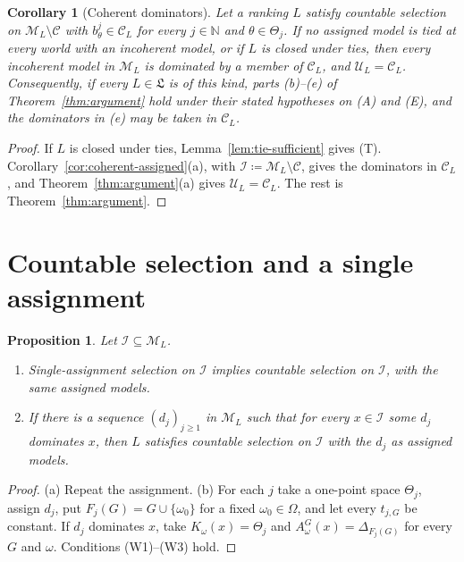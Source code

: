 \documentclass[11pt]{article}
\newtheorem{proposition}[theorem]{Proposition}
\newtheorem{corollary}[theorem]{Corollary}
\theoremstyle{definition}
\theoremstyle{remark}
\newcommand{\M}{\mathcal M}
\newcommand{\C}{\mathcal C}
\newcommand{\I}{\mathcal I}
\newcommand{\U}{\mathcal U}
\newcommand{\Lf}{\mathfrak L}
\begin{document}
\begin{corollary}[Coherent dominators]\label{cor:coherent-dominators}
Let a ranking $L$ satisfy countable selection on $\M_L\setminus\C$ with $b^j_\theta\in\C_L$ for every $j\in\mathbb N$ and $\theta\in\Theta_j$. If {\color{red}no assigned model is tied at every world with an incoherent model}, or if $L$ is closed under ties, then every incoherent model in $\M_L$ is dominated by a member of $\C_L$, and $\U_L=\C_L$. Consequently, if every $L\in\Lf$ is of this kind, parts (b)--(e) of Theorem~\ref{thm:argument} hold under their stated hypotheses on (A) and (E), and the dominators in (e) may be taken in $\C_L$.
\end{corollary}
\begin{proof}
If $L$ is closed under ties, Lemma~\ref{lem:tie-sufficient} gives {\color{red}(T)}. Corollary~\ref{cor:coherent-assigned}(a), with $\I\coloneqq\M_L\setminus\C$, gives the dominators in $\C_L$, and Theorem~\ref{thm:argument}(a) gives $\U_L=\C_L$. The rest is Theorem~\ref{thm:argument}.
\end{proof}

\section{Countable selection and a single assignment}\label{sec:scope}

\begin{proposition}\label{prop:comparison}
Let $\I\subseteq\M_L$.
\begin{enumerate}[label=(\alph*)]
\item Single-assignment selection on $\I$ implies countable selection on $\I${\color{red}, with the same assigned models}.
\item If there is a sequence $(d_j)_{j\ge1}$ in $\M_L$ such that for every $x\in\I$ some $d_j$ dominates $x$, {\color{red}then $L$ satisfies countable selection on $\I$ with the $d_j$ as assigned models.}
\end{enumerate}
\end{proposition}
\begin{proof}
(a) Repeat the assignment. (b) For each $j$ take a one-point space $\Theta_j$, assign $d_j$, put $F_j(G)=G\cup\{\omega_0\}$ for a fixed $\omega_0\in\Omega$, and let every $t_{j,G}$ be constant. If $d_j$ dominates $x$, take $K_\omega(x)=\Theta_j$ and $A^G_\omega(x)=\Delta_{F_j(G)}$ for every $G$ and $\omega$. {\color{red}Conditions (W1)--(W3) hold.}
\end{proof}
\end{document}
